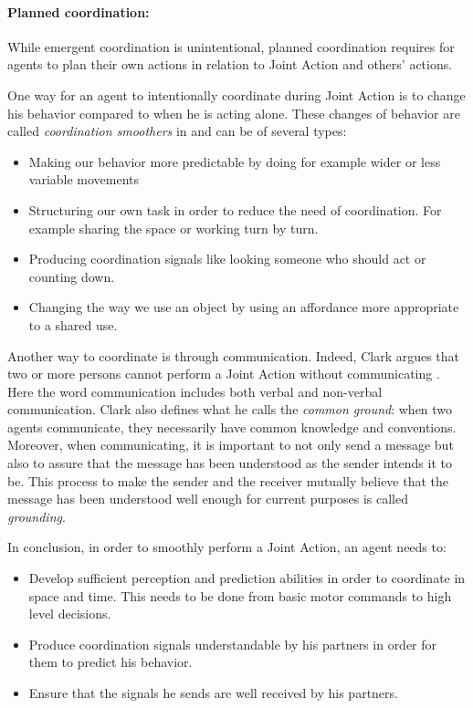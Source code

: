 \documentclass[english,a4paper,11pt,twoside]{StyleThese}
\begin{document}
\paragraph{Planned coordination:} 
While emergent coordination is unintentional, planned coordination requires for agents to plan their own actions in relation to Joint Action and others' actions.

One way for an agent to intentionally coordinate during Joint Action is to change his behavior compared to when he is acting alone. These changes of behavior are called \textit{coordination smoothers} in \cite{vesper2010minimal} and can be of several types:
\begin{itemize}
\item Making our behavior more predictable by doing for example wider or less variable movements
\item Structuring our own task in order to reduce the need of coordination. For example sharing the space or working turn by turn.
\item Producing coordination signals like looking someone who should act or counting down.
\item Changing the way we use an object by using an affordance more appropriate to a shared use.
\end{itemize}

Another way to coordinate is through communication. Indeed, Clark argues that two or more persons cannot perform a Joint Action without communicating \cite{clark1996using}. Here the word communication includes both verbal and non-verbal communication. Clark also defines what he calls the \textit{common ground}: when two agents communicate, they necessarily have common knowledge and conventions. Moreover, when communicating, it is important to not only send a message but also to assure that the message has been understood as the sender intends it to be. This process to make the sender and the receiver mutually believe that the message has been understood well enough for current purposes is called \textit{grounding}.

In conclusion, in order to smoothly perform a Joint Action, an agent needs to:
\begin{itemize}
\item Develop sufficient perception and prediction abilities in order to coordinate in space and time. This needs to be done from basic motor commands to high level decisions.
\item Produce coordination signals understandable by his partners in order for them to predict his behavior.
\item Ensure that the signals he sends are well received by his partners.
\end{itemize}
\end{document}

